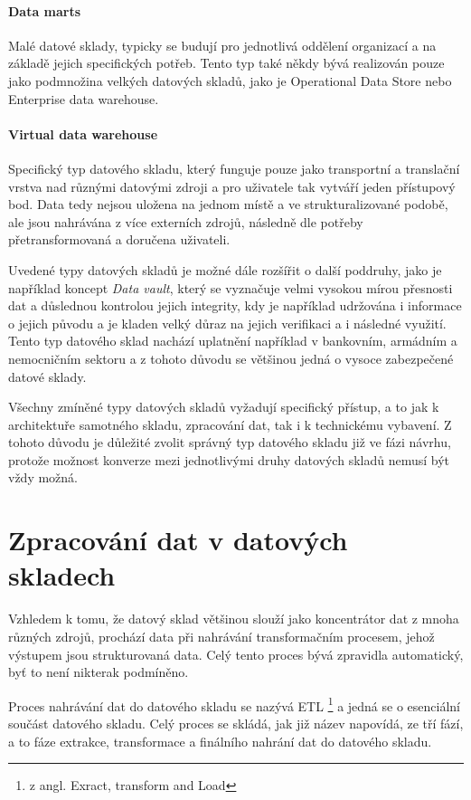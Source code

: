 \documentclass[
  digital,     %
  twoside,     %
  lof,         %
  lot,         %
]{fithesis4}
\begin{document}
\paragraph{Data marts}
Malé datové sklady, typicky se budují pro jednotlivá oddělení organizací a na základě jejich specifických potřeb. Tento typ také někdy bývá realizován pouze jako podmnožina velkých datových skladů, jako je Operational Data Store nebo Enterprise data warehouse.\parencite{Inmon2021}
\paragraph{Virtual data warehouse}
Specifický typ datového skladu, který funguje pouze jako transportní a translační vrstva nad různými datovými 
zdroji a pro uživatele tak vytváří jeden přístupový bod. Data tedy nejsou uložena na jednom místě a ve strukturalizované
podobě, ale jsou nahrávána z více externích zdrojů, následně dle potřeby přetransformovaná a doručena uživateli. 

\vspace{5mm}
Uvedené typy datových skladů je možné dále rozšířit o další poddruhy, jako je například koncept \emph{Data vault}, který se vyznačuje velmi vysokou mírou přesnosti dat a důslednou kontrolou jejich integrity, kdy je například udržována i informace o jejich původu a je kladen velký důraz na jejich verifikaci a i následné využití. Tento typ datového sklad nachází uplatnění například v bankovním, armádním a nemocničním sektoru a z tohoto důvodu se většinou jedná o vysoce zabezpečené datové sklady.\parencite{Inmon2021}


Všechny zmíněné typy datových skladů vyžadují specifický přístup, a to jak
k architektuře samotného skladu, zpracování dat, tak i k technickému vybavení. Z tohoto
důvodu je důležité zvolit správný typ datového skladu již ve fázi návrhu, protože
možnost konverze mezi jednotlivými druhy datových skladů nemusí být vždy možná.

\section{Zpracování dat v datových skladech}
Vzhledem k tomu, že datový sklad většinou slouží jako koncentrátor dat z mnoha různých zdrojů, prochází data při nahrávání transformačním procesem, jehož výstupem jsou strukturovaná data.
Celý tento proces bývá zpravidla automatický, byť to není nikterak podmíněno.

Proces nahrávání dat do datového skladu se nazývá ETL \footnote{z angl. Exract, transform and Load} 
a jedná se o esenciální součást datového skladu. Celý proces se skládá, jak již název
napovídá, ze tří fází, a to fáze extrakce, transformace a finálního nahrání dat do datového skladu.
\end{document}

